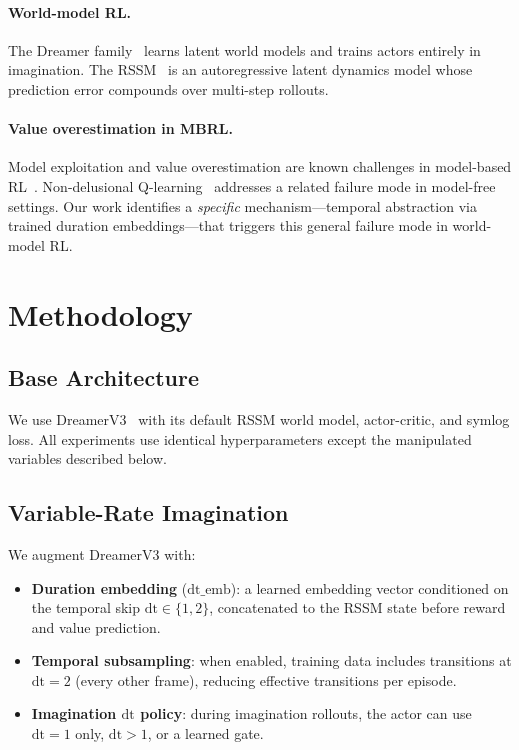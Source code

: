 \documentclass[10pt,letterpaper]{article}
\newcommand{\dt}{\mathrm{dt}}
\begin{document}
\paragraph{World-model RL.}
The Dreamer family~\citep{hafner2020dream,hafner2021mastering,hafner2023mastering} learns latent world models and trains actors entirely in imagination.
The RSSM~\citep{hafner2019learning} is an autoregressive latent dynamics model whose prediction error compounds over multi-step rollouts.

\paragraph{Value overestimation in MBRL.}
Model exploitation and value overestimation are known challenges in model-based RL~\citep{janner2019trust,pan2020trustworthy}.
Non-delusional Q-learning~\citep{lu2018non} addresses a related failure mode in model-free settings.
Our work identifies a \emph{specific} mechanism---temporal abstraction via trained duration embeddings---that triggers this general failure mode in world-model RL.

\section{Methodology}

\subsection{Base Architecture}
We use DreamerV3~\citep{hafner2023mastering} with its default RSSM world model, actor-critic, and symlog loss.
All experiments use identical hyperparameters except the manipulated variables described below.

\subsection{Variable-Rate Imagination}
We augment DreamerV3 with:
\begin{itemize}
    \item \textbf{Duration embedding} ($\dt\_\text{emb}$): a learned embedding vector conditioned on the temporal skip $\dt \in \{1,2\}$, concatenated to the RSSM state before reward and value prediction.
    \item \textbf{Temporal subsampling}: when enabled, training data includes transitions at $\dt=2$ (every other frame), reducing effective transitions per episode.
    \item \textbf{Imagination $\dt$ policy}: during imagination rollouts, the actor can use $\dt=1$ only, $\dt>1$, or a learned gate.
\end{itemize}
\end{document}
